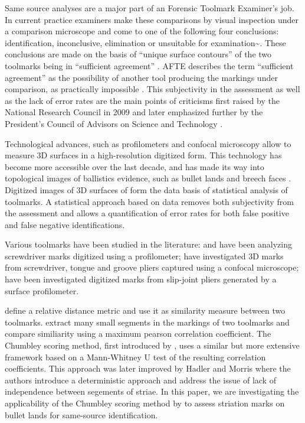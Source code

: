 \documentclass[12pt]{article}
\begin{document}
Same source analyses are a major part of an Forensic Toolmark Examiner's
job. In current practice examiners make these comparisons by visual
inspection under a comparison microscope and come to one of the
following four conclusions: identification, inconclusive, elimination or
unsuitable for examination\textasciitilde{}\citep{afte-toolmarks1998}.
These conclusions are made on the basis of ``unique surface contours''
of the two toolmarks being in ``sufficient agreement''
\citep{afte-toolmarks1998}. AFTE describes the term ``sufficient
agreement'' as the possibility of another tool producing the markings
under comparison, as practically impossible \citep{afte-toolmarks1998}.
This subjectivity in the assessment as well as the lack of error rates
are the main points of criticisms first raised by the National Research
Council in 2009 \citep{NAS:2009} and later emphasized further by the
President's Council of Advisors on Science and Technology
\citep{pcast2016}.

Technological advances, such as profilometers and confocal microscopy
allow to measure 3D surfaces in a high-resolution digitized form. This
technology has become more accessible over the last decade, and has made
its way into topological images of ballistics evidence, such as bullet
lands and breech faces
\citep{DeKinder1, DeKinder2, Bachrach1, vorburger2016}. Digitized images
of 3D surfaces of form the data basis of statistical analysis of
toolmarks. A statistical approach based on data removes both
subjectivity from the assessment and allows a quantification of error
rates for both false positive and false negative identifications.

Various toolmarks have been studied in the literature:
\citet{manytoolmarks1} and \citet{chumbley} have been analyzing
screwdriver marks digitized using a profilometer; \citet{manytoolmarks2}
have investigated 3D marks from screwdriver, tongue and groove pliers
captured using a confocal microscope; \citet{afte-chumbley} have been
investigated digitized marks from slip-joint pliers generated by a
surface profilometer.

 \citet{manytoolmarks2}
define a relative distance metric and use it as similarity measure
between two toolmarks. \citet{manytoolmarks1} extract many small
segments in the markings of two toolmarks and compare similiarity using
a maximum pearson correlation coefficient. The Chumbley scoring method,
first introduced by \citet{chumbley}, uses a similar but more extensive
framework based on a Mann-Whitney U test of the resulting correlation
coefficients. This approach was later improved by Hadler and Morris
\citep{hadler} where the authors introduce a deterministic approach and
address the issue of lack of independence between segements of striae.
In this paper, we are investigating the applicability of the Chumbley
scoring method by \citet{hadler} to assess striation marks on bullet
lands for same-source identification.
\end{document}
